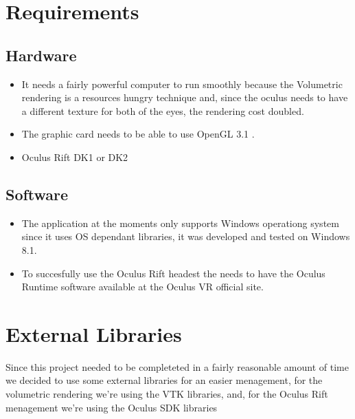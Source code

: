 \documentclass[11pt]{article} %
\begin{document}



\newpage
\section{Requirements}

\subsection{Hardware}
\begin{itemize}
\item It needs a fairly powerful computer to run smoothly because the Volumetric rendering is a resources hungry technique and, since the oculus needs to have a different texture for both of the eyes, the rendering cost doubled.

\item The graphic card needs to be able to use OpenGL 3.1 .

\item Oculus Rift DK1 or DK2
\end{itemize}


\subsection{Software}
\begin{itemize}
\item The application at the moments only supports Windows operationg system since it uses OS dependant libraries, it was developed and tested on Windows 8.1.
\item To succesfully use the Oculus Rift headest the needs to have the Oculus Runtime software available at the Oculus VR official site.
\end{itemize}













\newpage
\section{External Libraries}
Since this project needed to be completeted in a fairly reasonable amount of time we decided to use some external libraries for an easier menagement, for the volumetric rendering we're using the VTK libraries, and, for the Oculus Rift menagement we're using the Oculus SDK libraries
\end{document}
